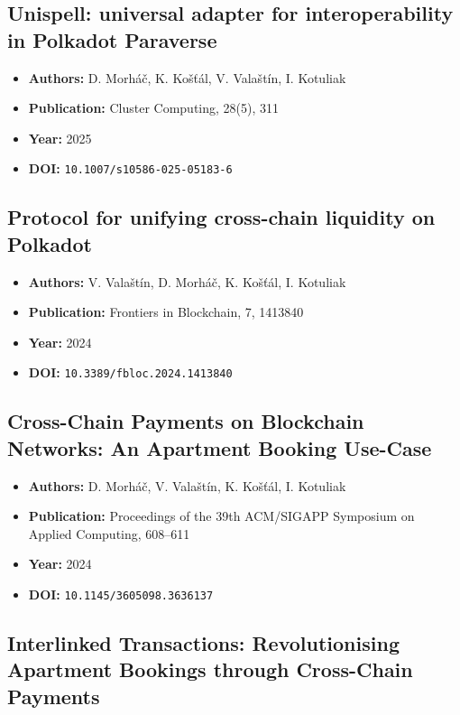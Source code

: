 
\subsection{Unispell: universal adapter for interoperability in Polkadot Paraverse}

\begin{itemize}
    \item \textbf{Authors:} D. Morháč, K. Košťál, V. Valaštín, I. Kotuliak
    \item \textbf{Publication:} Cluster Computing, 28(5), 311
    \item \textbf{Year:} 2025
    \item \textbf{DOI:} \texttt{10.1007/s10586-025-05183-6}
\end{itemize}

\subsection{Protocol for unifying cross-chain liquidity on Polkadot}

\begin{itemize}
    \item \textbf{Authors:} V. Valaštín, D. Morháč, K. Košťál, I. Kotuliak
    \item \textbf{Publication:} Frontiers in Blockchain, 7, 1413840
    \item \textbf{Year:} 2024
    \item \textbf{DOI:} \texttt{10.3389/fbloc.2024.1413840}
\end{itemize}

\subsection{Cross-Chain Payments on Blockchain Networks: An Apartment Booking Use-Case}

\begin{itemize}
    \item \textbf{Authors:} D. Morháč, V. Valaštín, K. Košťál, I. Kotuliak
    \item \textbf{Publication:} Proceedings of the 39th ACM/SIGAPP Symposium on Applied Computing, 608--611
    \item \textbf{Year:} 2024
    \item \textbf{DOI:} \texttt{10.1145/3605098.3636137}
\end{itemize}

\subsection{Interlinked Transactions: Revolutionising Apartment Bookings through Cross-Chain Payments}

